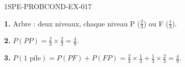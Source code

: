 \begin{corrige}{1SPE-PROBCOND-EX-017}

\textbf{1.} Arbre : deux niveaux, chaque niveau P ($\frac{2}{3}$) ou F ($\frac{1}{3}$).

\medskip
\textbf{2.} $P(PP) = \frac{2}{3} \times \frac{2}{3} = \frac{4}{9}$.

\medskip
\textbf{3.} $P(\text{1 pile}) = P(PF) + P(FP) = \frac{2}{3}\times\frac{1}{3} + \frac{1}{3}\times\frac{2}{3} = \frac{4}{9}$.

\end{corrige}
